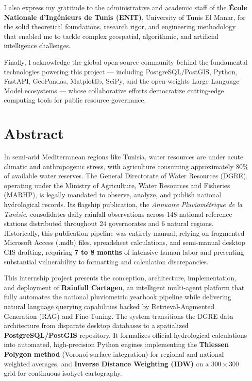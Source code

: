 \documentclass[12pt,a4paper]{report}
\begin{document}
I also express my gratitude to the administrative and academic staff of the \textbf{École Nationale d'Ingénieurs de Tunis (ENIT)}, University of Tunis El Manar, for the solid theoretical foundations, research rigor, and engineering methodology that enabled me to tackle complex geospatial, algorithmic, and artificial intelligence challenges.

Finally, I acknowledge the global open-source community behind the fundamental technologies powering this project --- including PostgreSQL/PostGIS, Python, FastAPI, GeoPandas, Matplotlib, SciPy, and the open-weights Large Language Model ecosystems --- whose collaborative efforts democratize cutting-edge computing tools for public resource governance.

\newpage

\chapter*{Abstract}

In semi-arid Mediterranean regions like Tunisia, water resources are under acute climatic and anthropogenic stress, with agriculture consuming approximately 80\% of available water reserves. The General Directorate of Water Resources (DGRE), operating under the Ministry of Agriculture, Water Resources and Fisheries (MARHP), is legally mandated to observe, analyze, and publish national hydrological records. Its flagship publication, the \textit{Annuaire Pluviométrique de la Tunisie}, consolidates daily rainfall observations across 148 national reference stations distributed throughout 24 governorates and 6 natural regions. Historically, this publication pipeline was entirely manual, relying on fragmented Microsoft Access (.mdb) files, spreadsheet calculations, and semi-manual desktop GIS drafting, requiring \textbf{7 to 8 months} of intensive human labor and presenting substantial vulnerability to formatting and calculation discrepancies.

This internship project presents the conception, architecture, implementation, and deployment of \textbf{Rainfull Cartagen}, an intelligent multi-agent platform that fully automates the national pluviometric yearbook pipeline while delivering natural language querying capabilities backed by Retrieval-Augmented Generation (RAG) and Fine-Tuning. The system transitions the DGRE data architecture from disparate desktop databases to a spatialized \textbf{PostgreSQL/PostGIS} repository. It formalizes official hydrological calculations into automated, high-precision Python engines implementing the \textbf{Thiessen Polygon method} (Voronoi surface integration) for regional and national weighted averages, and \textbf{Inverse Distance Weighting (IDW)} on a $300 \times 300$ grid for continuous isohyet cartography.
\end{document}
